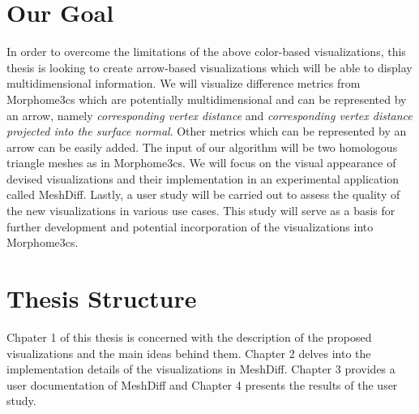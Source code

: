 \addtocounter{footnote}{-3}
\section*{Our Goal}

In order to overcome the limitations of the above color-based visualizations, this thesis is looking to create arrow-based visualizations which will be able to display multidimensional information. We will visualize difference metrics from Morphome3cs which are potentially multidimensional and can be represented by an arrow, namely {\it corresponding vertex distance} and {\it corresponding vertex distance projected into the surface normal}. Other metrics which can be represented by an arrow can be easily added. The input of our algorithm will be two homologous triangle meshes as in Morphome3cs. We will focus on the visual appearance of devised visualizations and their implementation in an experimental application called MeshDiff. Lastly, a user study will be carried out to assess the quality of the new visualizations in various use cases. This study will serve as a basis for further development and potential incorporation of the visualizations into Morphome3cs.
\section*{Thesis Structure}

Chpater 1 of this thesis is concerned with the description of the proposed visualizations and the main ideas behind them. Chapter 2 delves into the implementation details of the visualizations in MeshDiff. Chapter 3 provides a user documentation of MeshDiff and Chapter 4 presents the results of the user study.